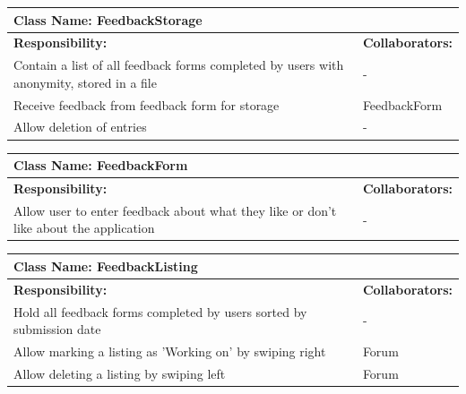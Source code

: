 \documentclass[12pt]{article}
\begin{document}
	\begin{table}[ht]
		\centering
		\begin{tabular}{|p{5cm}|p{5cm}|}
		\hline
		 \multicolumn{2}{|l|}{\textbf{Class Name:} FeedbackStorage} \\
		\hline
		\textbf{Responsibility:} & \textbf{Collaborators:} \\
		\hline
		Contain a list of all feedback forms completed by users with anonymity, stored in a file & -\\
		\hline
	    Receive feedback from feedback form for storage & FeedbackForm\\
		\hline
		Allow deletion of entries & - \\
		\hline
		\end{tabular}
	\end{table}

	\begin{table}[ht]
		\centering
		\begin{tabular}{|p{5cm}|p{5cm}|}
		\hline
		 \multicolumn{2}{|l|}{\textbf{Class Name:} FeedbackForm} \\
		\hline
		\textbf{Responsibility:} & \textbf{Collaborators:} \\
		\hline
	    Allow user to enter feedback about what they like or don't like about the application & -\\
		\hline

		\end{tabular}
	\end{table}

	\begin{table}[ht]
		\centering
		\begin{tabular}{|p{5cm}|p{5cm}|}
		\hline
		 \multicolumn{2}{|l|}{\textbf{Class Name:} FeedbackListing} \\
		\hline
		\textbf{Responsibility:} & \textbf{Collaborators:} \\
		\hline
	    Hold all feedback forms completed by users sorted by submission date & -\\
	    \hline
	    Allow marking a listing as 'Working on' by swiping right & Forum \\
		\hline
		Allow deleting a listing by swiping left & Forum\\
		\hline
		\end{tabular}
	\end{table}
\end{document}
